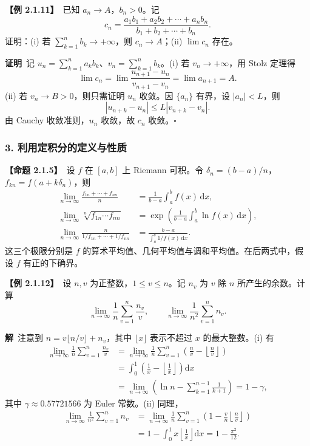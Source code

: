 \documentclass[UTF8,a4paper,11pt]{ctexart}
\newcommand{\ex}[1]{\par\medskip\noindent\textbf{【例 #1】}\ }
\newcommand{\prop}[1]{\par\medskip\noindent\textbf{【命题 #1】}\ }
\newcommand{\pf}{\par\noindent\textbf{证明}\ }
\newcommand{\sol}{\par\noindent\textbf{解}\ }
\begin{document}
\ex{2.1.11}已知 $a_n\to A$，$b_n>0$。记
\[
c_n=\frac{a_1b_1+a_2b_2+\cdots+a_nb_n}{b_1+b_2+\cdots+b_n}.
\]
证明：(i) 若 $\sum_{k=1}^{n}b_k\to+\infty$，则 $c_n\to A$；(ii) $\lim c_n$ 存在。
\pf 记 $u_n=\sum_{k=1}^{n}a_kb_k$、$v_n=\sum_{k=1}^{n}b_k$。(i) 若 $v_n\to+\infty$，用 Stolz 定理得
\[
\lim c_n=\lim\frac{u_{n+1}-u_n}{v_{n+1}-v_n}=\lim a_{n+1}=A.
\]
(ii) 若 $v_n\to B>0$，则只需证明 $u_n$ 收敛。因 $\{a_n\}$ 有界，设 $|a_n|<L$，则
\[
|u_{n+k}-u_n|\le L|v_{n+k}-v_n|.
\]
由 Cauchy 收敛准则，$u_n$ 收敛，故 $c_n$ 收敛。\hfill$\square$

\subsubsection*{3. 利用定积分的定义与性质}
\prop{2.1.5}设 $f$ 在 $[a,b]$ 上 Riemann 可积。令 $\delta_n=(b-a)/n$，$f_{kn}=f(a+k\delta_n)$，则
\begin{align*}
\lim_{n\to\infty}\frac{f_{1n}+\cdots+f_{nn}}n&=\frac1{b-a}\int_a^b f(x)\,\mathrm dx,\\
\lim_{n\to\infty}\sqrt[n]{f_{1n}\cdots f_{nn}}&=\exp\!\left(\frac1{b-a}\int_a^b\ln f(x)\,\mathrm dx\right),\\
\lim_{n\to\infty}\frac{n}{1/f_{1n}+\cdots+1/f_{nn}}&=\frac{b-a}{\int_a^b 1/f(x)\,\mathrm dx}.
\end{align*}
这三个极限分别是 $f$ 的算术平均值、几何平均值与调和平均值。在后两式中，假设 $f$ 有正的下确界。

\ex{2.1.12}设 $n,v$ 为正整数，$1\le v\le n$。记 $n_v$ 为 $v$ 除 $n$ 所产生的余数。计算
\[
\lim_{n\to\infty}\frac1n\sum_{v=1}^{n}\frac{n_v}{v},
\qquad
\lim_{n\to\infty}\frac1{n^2}\sum_{v=1}^{n}n_v.
\]
\sol 注意到 $n=v\lfloor n/v\rfloor+n_v$，其中 $\lfloor x\rfloor$ 表示不超过 $x$ 的最大整数。(i) 有
\begin{align*}
\lim_{n\to\infty}\frac1n\sum_{v=1}^{n}\frac{n_v}{v}
&=\lim_{n\to\infty}\frac1n\sum_{v=1}^{n}\left(\frac nv-\left\lfloor\frac nv\right\rfloor\right)\\
&=\int_0^1\left(\frac1x-\left\lfloor\frac1x\right\rfloor\right)\mathrm dx\\
&=\lim_{n\to\infty}\left(\ln n-\sum_{k=1}^{n-1}\frac1{k+1}\right)=1-\gamma,
\end{align*}
其中 $\gamma\approx0.57721566$ 为 Euler 常数。(ii) 同理，
\begin{align*}
\lim_{n\to\infty}\frac1{n^2}\sum_{v=1}^{n}n_v
&=\lim_{n\to\infty}\frac1n\sum_{v=1}^{n}
\left(1-\frac vn\left\lfloor\frac nv\right\rfloor\right)\\
&=1-\int_0^1x\left\lfloor\frac1x\right\rfloor\mathrm dx
=1-\frac{\pi^2}{12}.
\end{align*}
\end{document}
